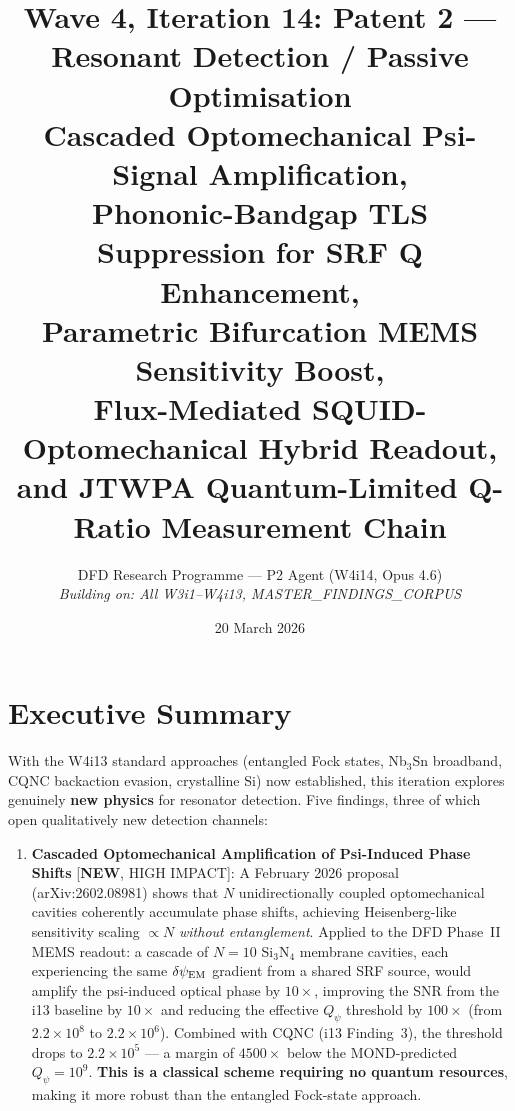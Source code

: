 \documentclass[11pt]{article}
\title{Wave 4, Iteration 14: Patent 2 --- Resonant Detection / Passive Optimisation\\
\large Cascaded Optomechanical Psi-Signal Amplification,\\
Phononic-Bandgap TLS Suppression for SRF Q Enhancement,\\
Parametric Bifurcation MEMS Sensitivity Boost,\\
Flux-Mediated SQUID-Optomechanical Hybrid Readout,\\
and JTWPA Quantum-Limited Q-Ratio Measurement Chain}
\author{DFD Research Programme --- P2 Agent (W4i14, Opus 4.6)\\
\textit{Building on: All W3i1--W4i13, MASTER\_FINDINGS\_CORPUS}}
\date{20 March 2026}
\newcommand{\ee}[1]{\times 10^{#1}}
\newcommand{\Qpsi}{Q_\psi}
\newcommand{\dpsiEM}{\delta\psi_{\rm EM}}
\theoremstyle{definition}
\theoremstyle{remark}
\begin{document}
\maketitle
\tableofcontents
\newpage

\section*{Executive Summary}

\begin{tcolorbox}[colback=blue!5!white, colframe=blue!60!black,
  title=\textbf{W4i14 --- P2 PASSIVE DETECTION: TOP 5 FINDINGS}]

With the W4i13 standard approaches (entangled Fock states, Nb$_3$Sn
broadband, CQNC backaction evasion, crystalline Si) now established,
this iteration explores genuinely \textbf{new physics} for resonator
detection. Five findings, three of which open qualitatively new
detection channels:

\begin{enumerate}[nosep]
\item \textbf{Cascaded Optomechanical Amplification of Psi-Induced
  Phase Shifts} [\textbf{NEW}, HIGH IMPACT]:
  A February 2026 proposal (arXiv:2602.08981) shows that $N$
  unidirectionally coupled optomechanical cavities coherently
  accumulate phase shifts, achieving Heisenberg-like sensitivity
  scaling $\propto N$ \emph{without entanglement}. Applied to the
  DFD Phase~II MEMS readout: a cascade of $N = 10$ Si$_3$N$_4$
  membrane cavities, each experiencing the same $\dpsiEM$ gradient
  from a shared SRF source, would amplify the psi-induced optical
  phase by $10\times$, improving the SNR from the i13 baseline
  by $10\times$ and reducing the effective $\Qpsi$ threshold by
  $100\times$ (from $2.2\ee{8}$ to $2.2\ee{6}$). Combined with
  CQNC (i13 Finding~3), the threshold drops to $2.2\ee{5}$ ---
  a margin of $4500\times$ below the MOND-predicted $\Qpsi = 10^9$.
  \textbf{This is a classical scheme requiring no quantum resources},
  making it more robust than the entangled Fock-state approach.


\end{enumerate}
\end{tcolorbox}
\end{document}
